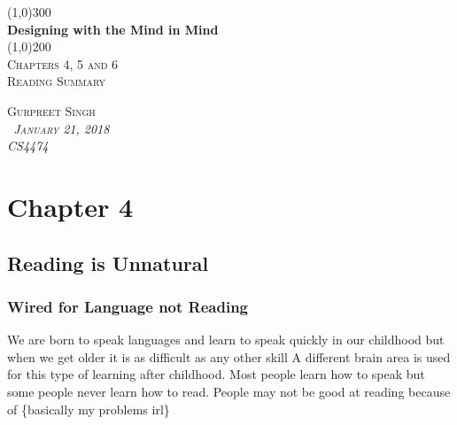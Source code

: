 \documentclass[11pt,]{article}
\begin{document}
\doublespacing

\begin{titlepage}
    \begin{center}
    \line(1,0){300} \\ 
    [0.25in]
    \huge{\bfseries Designing with the Mind in Mind} \\
    [2mm]
    \line(1,0){200} \\
    [1.5cm] 
    \textsc{\Large Chapters 4, 5 and 6} \\
    [0.75cm]
    \textsc{\Large Reading Summary} \\
    [9cm]
    \end{center}
    
    \begin{flushright}
    \textsc{\Large{Gurpreet Singh \\}\normalsize\emph{\ January 21, 2018 \\}\normalsize\emph{CS4474 \\} }
    
    \end{flushright}

\end{titlepage}

\newpage
\shipout\null

\hypertarget{chapter-4}{%
\section{Chapter 4}\label{chapter-4}}

\hypertarget{reading-is-unnatural}{%
\subsection{Reading is Unnatural}\label{reading-is-unnatural}}

\hypertarget{wired-for-language-not-reading}{%
\subsubsection{Wired for Language not
Reading}\label{wired-for-language-not-reading}}

We are born to speak languages and learn to speak quickly in our
childhood but when we get older it is as difficult as any other skill A
different brain area is used for this type of learning after childhood.
Most people learn how to speak but some people never learn how to read.
People may not be good at reading because of \{basically my problems
irl\}
\end{document}
